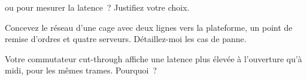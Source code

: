 \begin{interviewq}\label{iq:nw:switches-and-layer-1-devices:4}
 ou  pour mesurer la latence~? Justifiez votre choix.
\end{interviewq}

\begin{interviewq}\label{iq:nw:switches-and-layer-1-devices:5}
Concevez le réseau d'une cage avec deux lignes vers la plateforme, un point de remise d'ordres et quatre serveurs. Détaillez-moi les cas de panne.
\end{interviewq}

\begin{interviewq}\label{iq:nw:switches-and-layer-1-devices:6}
Votre commutateur cut-through affiche une latence plus élevée à l'ouverture qu'à midi, pour les mêmes trames. Pourquoi~?
\end{interviewq}
